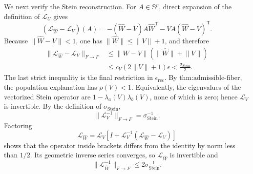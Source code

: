 We next verify the Stein reconstruction.  For \(A\in\mathbb S^p\), direct expansion of the definition of \(\mathcal L_U\) gives
\[
 (\mathcal L_{\widehat W}-\mathcal L_V)(A)
 =-(\widehat W-V)A\widehat W^{\mathsf T}
  -VA(\widehat W-V)^{\mathsf T}.
\]
Because \(\lVert\widehat W-V\rVert<1\), one has \(\lVert\widehat W\rVert\le\lVert V\rVert+1\), and therefore
\[
 \begin{aligned}
 \lVert\mathcal L_{\widehat W}-\mathcal L_V\rVert_{F\to F}
 &\le \lVert\widehat W-V\rVert
       (\lVert\widehat W\rVert+\lVert V\rVert)\\
 &\le c_V(2\lVert V\rVert+1)\epsilon
 <\frac{\sigma_{\mathrm{Stein}}}{2}.
 \end{aligned}
\]
The last strict inequality is the final restriction in \(\epsilon_{\mathrm{rec}}\).  By \(\text{thm:admissible-fiber}\), the population explanation has \(\rho(V)<1\).  Equivalently, the eigenvalues of the vectorized Stein operator are \(1-\lambda_a(V)\lambda_b(V)\), none of which is zero; hence \(\mathcal L_V\) is invertible.  By the definition of \(\sigma_{\mathrm{Stein}}\),
\[
 \lVert\mathcal L_V^{-1}\rVert_{F\to F}=\sigma_{\mathrm{Stein}}^{-1}.
\]
Factoring
\[
 \mathcal L_{\widehat W}
 =\mathcal L_V\left[I+\mathcal L_V^{-1}
   (\mathcal L_{\widehat W}-\mathcal L_V)\right]
\]
shows that the operator inside brackets differs from the identity by norm less than \(1/2\).  Its geometric inverse series converges, so \(\mathcal L_{\widehat W}\) is invertible and
\[
 \lVert\mathcal L_{\widehat W}^{-1}\rVert_{F\to F}
 \le2\sigma_{\mathrm{Stein}}^{-1}.
\]

